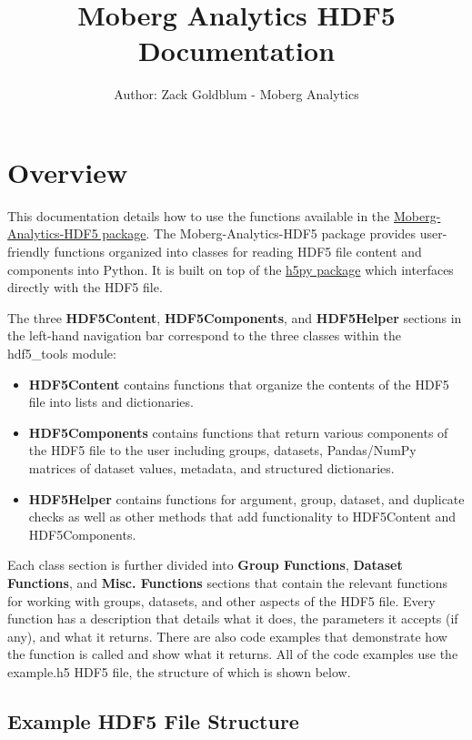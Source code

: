 \documentclass[
]{article}
\title{Moberg Analytics HDF5 Documentation}
\author{Author: Zack Goldblum - Moberg Analytics}
\date{}
\begin{document}
\maketitle

{
\setcounter{tocdepth}{2}
\tableofcontents
}
\hypertarget{overview}{%
\section{Overview}\label{overview}}

This documentation details how to use the functions available in the \href{https://test.pypi.org/project/Moberg-Analytics-HDF5/}{Moberg-Analytics-HDF5 package}. The Moberg-Analytics-HDF5 package provides user-friendly functions organized into classes for reading HDF5 file content and components into Python. It is built on top of the \href{https://www.h5py.org/}{h5py package} which interfaces directly with the HDF5 file.

The three \textbf{HDF5Content}, \textbf{HDF5Components}, and \textbf{HDF5Helper} sections in the left-hand navigation bar correspond to the three classes within the hdf5\_tools module:

\begin{itemize}
\item
  \textbf{HDF5Content} contains functions that organize the contents of the HDF5 file into lists and dictionaries.
\item
  \textbf{HDF5Components} contains functions that return various components of the HDF5 file to the user including groups, datasets, Pandas/NumPy matrices of dataset values, metadata, and structured dictionaries.
\item
  \textbf{HDF5Helper} contains functions for argument, group, dataset, and duplicate checks as well as other methods that add functionality to HDF5Content and HDF5Components.
\end{itemize}

Each class section is further divided into \textbf{Group Functions}, \textbf{Dataset Functions}, and \textbf{Misc. Functions} sections that contain the relevant functions for working with groups, datasets, and other aspects of the HDF5 file. Every function has a description that details what it does, the parameters it accepts (if any), and what it returns. There are also code examples that demonstrate how the function is called and show what it returns. All of the code examples use the example.h5 HDF5 file, the structure of which is shown below.

\hypertarget{example-hdf5-file-structure}{%
\subsection{Example HDF5 File Structure}\label{example-hdf5-file-structure}}
\end{document}
